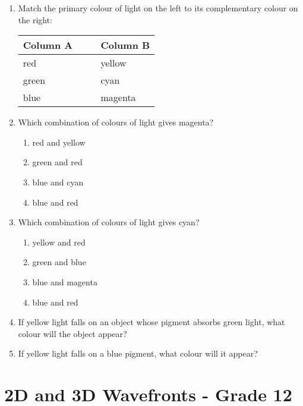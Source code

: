 \begin{enumerate}
\item{
Match the primary colour of light on the left to its complementary colour on the right:
\begin{center}
\begin{tabular}{ll}
\textbf{Column A} & \textbf{Column B} \\ \hline
red   \ \ \ & yellow \\
green \ \ \ \ \ \ \ \ \ & cyan \\
blue  \ \ \ & magenta \\
\end{tabular}
\end{center}
} 

\item{
Which combination of colours of light gives magenta?
\renewcommand{\labelenumii}{\Alph{enumii}}
\begin{enumerate}
\item red and yellow
\item green and red
\item blue and cyan
\item blue and red
\end{enumerate}
}

\item{
Which combination of colours of light gives cyan?
\renewcommand{\labelenumii}{\Alph{enumii}}
\begin{enumerate}
\item yellow and red
\item green and blue
\item blue and magenta
\item blue and red
\end{enumerate}
}

\item{If yellow light falls on an object whose pigment absorbs green light, what colour will the object appear?}

\item{If yellow light falls on a blue pigment, what colour will it appear?}

\end{enumerate}





\chapter{2D and 3D Wavefronts - Grade 12}
\label{p:wsl:2d3d12}

